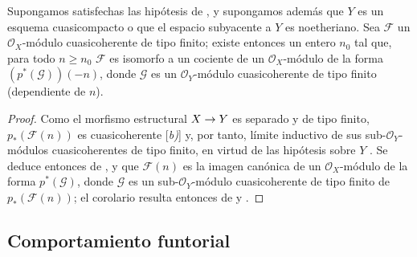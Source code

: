 \documentclass[oneside,10pt]{amsart}
\makeatletter
\renewcommand{\geq}{\geqslant}
\newcommand{\ega@arrow}[2]{\mathchoice{#1}{#2}{#2}{#2}}
\renewcommand{\to}{\ega@arrow{\longrightarrow}{\rightarrow}}
\let\EGAOriginalLabel\label
\renewcommand{\label}[1]{\phantomsection\EGAOriginalLabel{#1}}
\makeatother
\begin{document}
\begin{corollary}[3.4.8]
\label{II.3.4.8-fr}
Supongamos satisfechas las hipótesis de , y supongamos además que $Y$ es un esquema cuasicompacto o que el espacio subyacente a $Y$ es noetheriano.
Sea $\mathcal{F}$ un $\mathcal{O}_X$-módulo cuasicoherente de tipo finito; existe entonces un entero $n_0$ tal que, para todo $n\geq n_0$ $\mathcal{F}$ es isomorfo a un cociente de un $\mathcal{O}_X$-módulo de la forma $(p^*(\mathcal{G}))(-n)$, donde $\mathcal{G}$ es un $\mathcal{O}_Y$-módulo cuasicoherente de tipo finito (dependiente de $n$).
\end{corollary}

\begin{proof}
Como el morfismo estructural $X\to Y$ es separado y de tipo finito, $p_*(\mathcal{F}(n))$ es cuasicoherente [\emph{b)}] y, por tanto, límite inductivo de sus sub-$\mathcal{O}_Y$-módulos cuasicoherentes de tipo finito, en virtud de las hipótesis sobre $Y$ .
Se deduce entonces de ,  y  que $\mathcal{F}(n)$ es la imagen canónica de un $\mathcal{O}_X$-módulo de la forma $p^*(\mathcal{G})$, donde $\mathcal{G}$ es un sub-$\mathcal{O}_Y$-módulo cuasicoherente de tipo finito de $p_*(\mathcal{F}(n))$; el corolario resulta entonces de  y .
\end{proof}

\subsection{Comportamiento funtorial}
\label{subsection:II.3.5-fr}
\end{document}
